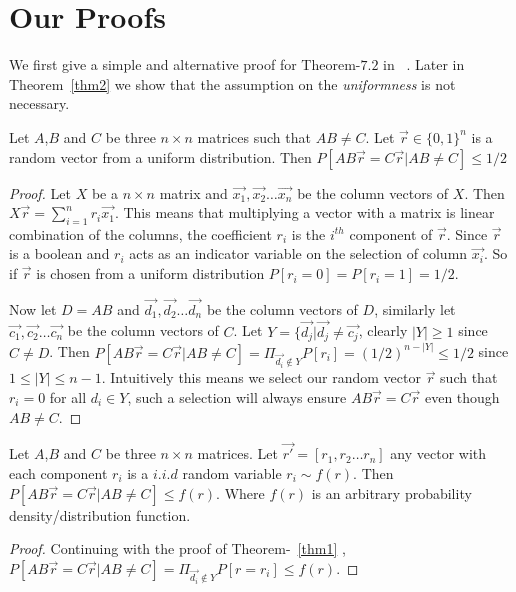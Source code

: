 \documentclass[runningheads]{llncs}
\begin{document}
\section{Our Proofs}
We first give a simple and alternative proof for Theorem-$7.2$ in ~\cite{motwani1995}. Later in Theorem~\ref{thm2}
we show that the assumption on the {\em uniformness} is not necessary. 
\begin{theorem}
\label{thm1}
Let $A$,$B$ and $C$ be three $n\times n$ matrices such that $AB \neq C$. Let $\vec{r} \in \{0,1\}^n$
is a random vector from a uniform distribution. Then $P[AB\vec{r} = C\vec{r} | AB \neq C] \leq 1/2$
\end{theorem}
\begin{proof}
Let $X$ be a $n\times n$ matrix and $\vec{x_1}, \vec{x_2}\ldots \vec{x_n}$ be the column vectors of $X$.
Then $X\vec{r} = \sum_{i=1}^{n}r_i\vec{x_1}$. This means that multiplying a vector with a matrix is linear
combination of the columns, the coefficient $r_i$ is the $i^{th}$ component of $\vec{r}$. Since $\vec{r}$
is a boolean and $r_i$ acts as an indicator variable on the selection of column $\vec{x_i}$. So if $\vec{r}$
is chosen from a uniform distribution $P[r_i=0] = P[r_i=1] = 1/2$. 

Now let $D=AB$ and $\vec{d_1},\vec{d_2}\ldots \vec{d_n}$ be the column vectors of $D$, similarly 
let $\vec{c_1},\vec{c_2}\ldots \vec{c_n}$ be the column vectors of $C$. Let
$Y =\{\vec{d_j} | \vec{d_j}\neq \vec{c_j}$, clearly $|Y| \geq 1$ since $C\neq D$. Then
$P[AB\vec{r} = C\vec{r} | AB \neq C] = \displaystyle\Pi_{\vec{d_i}\notin Y}P[r_i] = (1/2)^{n-|Y|} \leq 1/2$
since $1 \leq |Y|\leq n-1$.  Intuitively this means we select our random vector $\vec{r}$ such that
$r_i=0$ for all $d_i \in Y$, such a selection will always ensure $AB\vec{r} = C\vec{r}$ even though
$AB\neq C$.
\end{proof}

\begin{theorem}
\label{thm2}
Let $A$,$B$ and $C$ be three $n \times n$ matrices. Let $\vec{r'} = [r_1,r_2\ldots r_n]$ any vector
with each component $r_i$ is a $i.i.d$ random variable $r_i \sim f(r)$. Then 
$P[AB\vec{r} = C\vec{r} | AB\neq C] \leq f(r)$. Where $f(r)$ is an arbitrary probability density/distribution
function.
\end{theorem}
\begin{proof}
Continuing with the proof of Theorem-~\ref{thm1} , $P[AB\vec{r} = C\vec{r}|AB\neq C] = \displaystyle\Pi_{\vec{d_i}\notin Y} P[r=r_i] \leq f(r)$.
\end{proof}
\end{document}

